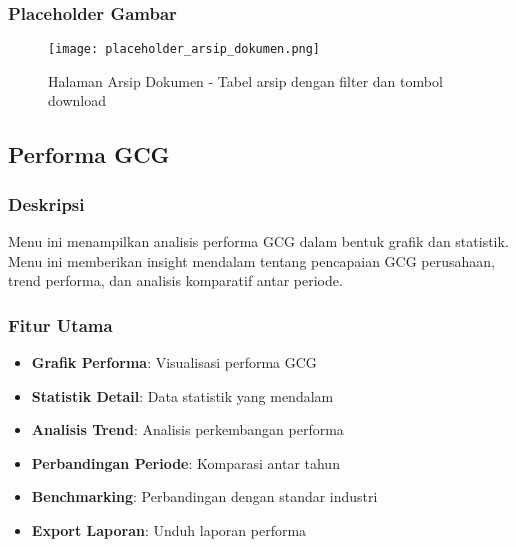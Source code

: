 \documentclass[12pt,a4paper]{article}
\begin{document}
\subsubsection{Placeholder Gambar}
\begin{figure}[H]
\centering
\texttt{[image: placeholder\_arsip\_dokumen.png]}
\caption{Halaman Arsip Dokumen - Tabel arsip dengan filter dan tombol download}
\label{fig:arsip_dokumen}
\end{figure}

\subsection{Performa GCG}

\subsubsection{Deskripsi}
Menu ini menampilkan analisis performa GCG dalam bentuk grafik dan statistik. Menu ini memberikan insight mendalam tentang pencapaian GCG perusahaan, trend performa, dan analisis komparatif antar periode.

\subsubsection{Fitur Utama}
\begin{itemize}
\item \textbf{Grafik Performa}: Visualisasi performa GCG
\item \textbf{Statistik Detail}: Data statistik yang mendalam
\item \textbf{Analisis Trend}: Analisis perkembangan performa
\item \textbf{Perbandingan Periode}: Komparasi antar tahun
\item \textbf{Benchmarking}: Perbandingan dengan standar industri
\item \textbf{Export Laporan}: Unduh laporan performa
\end{itemize}
\end{document}

